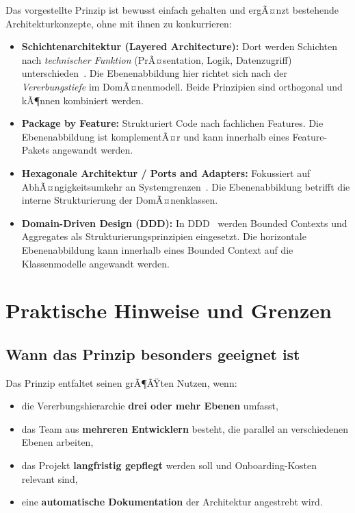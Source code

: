 ﻿\documentclass[a4paper,12pt]{article}
\begin{document}
Das vorgestellte Prinzip ist bewusst einfach gehalten und ergÃ¤nzt bestehende
Architekturkonzepte, ohne mit ihnen zu konkurrieren:

\begin{itemize}[leftmargin=*]
	\item \textbf{Schichtenarchitektur (Layered Architecture):} Dort werden
	Schichten nach \textit{technischer Funktion} (PrÃ¤sentation, Logik,
	Datenzugriff) unterschieden~\cite{fowler2002}. Die Ebenenabbildung
	hier richtet sich nach der \textit{Vererbungstiefe} im DomÃ¤nenmodell.
	Beide Prinzipien sind orthogonal und kÃ¶nnen kombiniert werden.
	
	\item \textbf{Package by Feature:} Strukturiert Code nach fachlichen
	Features. Die Ebenenabbildung ist komplementÃ¤r und kann innerhalb
	eines Feature-Pakets angewandt werden.
	
	\item \textbf{Hexagonale Architektur / Ports and Adapters:} Fokussiert auf
	AbhÃ¤ngigkeitsumkehr an Systemgrenzen~\cite{cockburn2005}. Die
	Ebenenabbildung betrifft die interne Strukturierung der DomÃ¤nenklassen.
	
	\item \textbf{Domain-Driven Design (DDD):} In DDD~\cite{evans2003} werden
	Bounded Contexts und Aggregates als Strukturierungsprinzipien eingesetzt.
	Die horizontale Ebenenabbildung kann innerhalb eines Bounded Context
	auf die Klassenmodelle angewandt werden.
\end{itemize}

\section{Praktische Hinweise und Grenzen}

\subsection{Wann das Prinzip besonders geeignet ist}

Das Prinzip entfaltet seinen grÃ¶ÃŸten Nutzen, wenn:
\begin{itemize}[leftmargin=*]
	\item die Vererbungshierarchie \textbf{drei oder mehr Ebenen} umfasst,
	\item das Team aus \textbf{mehreren Entwicklern} besteht, die parallel an
	verschiedenen Ebenen arbeiten,
	\item das Projekt \textbf{langfristig gepflegt} werden soll und
	Onboarding-Kosten relevant sind,
	\item eine \textbf{automatische Dokumentation} der Architektur angestrebt wird.
\end{itemize}
\end{document}

